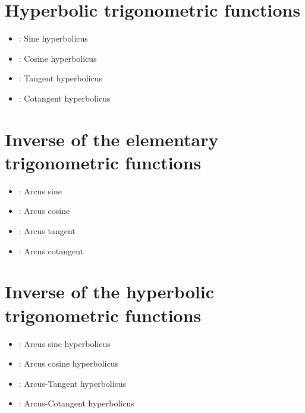 \section{Hyperbolic trigonometric functions}

\begin{itemize}

\item
{}:
Sine hyperbolicus

\item
{}:
Cosine hyperbolicus

\item
{}:
Tangent hyperbolicus

\item
{}:
Cotangent hyperbolicus

\end{itemize}



\section{Inverse of the elementary trigonometric functions}

\begin{itemize}

\item
{}:
Arcus sine

\item
{}:
Arcus cosine

\item
{}:
Arcus tangent

\item
{}:
Arcus cotangent

\end{itemize}



\section{Inverse of the hyperbolic trigonometric functions}

\begin{itemize}

\item
{}:
Arcus sine hyperbolicus

\item
{}:
Arcus cosine hyperbolicus

\item
{}:
Arcus-Tangent hyperbolicus

\item
{}:
Arcus-Cotangent hyperbolicus

\end{itemize}



